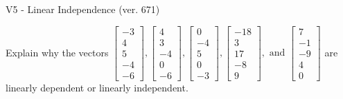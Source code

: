 \begin{exercise}
  \begin{exerciseTitle}V5 - Linear Independence (ver. 671)\end{exerciseTitle}
  \begin{exerciseStatement}
    Explain why the vectors \(\left[\begin{array}{r}
-3 \\
4 \\
5 \\
-4 \\
-6
\end{array}\right] , \left[\begin{array}{r}
4 \\
3 \\
-4 \\
0 \\
-6
\end{array}\right] , \left[\begin{array}{r}
0 \\
-4 \\
5 \\
0 \\
-3
\end{array}\right] , \left[\begin{array}{r}
-18 \\
3 \\
17 \\
-8 \\
9
\end{array}\right] , \text{ and } \left[\begin{array}{r}
7 \\
-1 \\
-9 \\
4 \\
0
\end{array}\right]\) are linearly dependent or linearly independent.	



\end{exerciseStatement}
\end{exercise}
